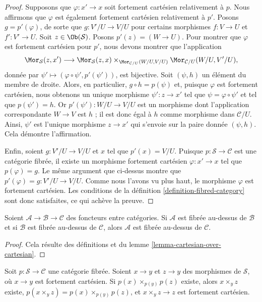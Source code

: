 \begin{proof}
Supposons que $\varphi : x' \to x$ soit fortement cartésien relativement
à $p$. Nous affirmons que $\varphi$ est également fortement cartésien
relativement à $p'$. Posons $g = p'(\varphi)$, de sorte que
$g : V'/U \to V/U$ pour certains morphismes $f : V \to U$ et
$f' : V' \to U$.
Soit $z \in \Ob(\mathcal{S})$. Posons $p'(z) = (W \to U)$.
Pour montrer que $\varphi$ est fortement cartésien pour $p'$, nous devons
montrer que l'application
$$
\Mor_\mathcal{S}(z, x')
\longrightarrow
\Mor_\mathcal{S}(z, x)
\times_{\Mor_{\mathcal{C}/U}(W/U, V/U)}
\Mor_{\mathcal{C}/U}(W/U, V'/U),
$$
donnée par $\psi' \longmapsto (\varphi \circ \psi', p'(\psi'))$,
est bijective. Soit $(\psi, h)$ un élément du membre de droite. Alors, en
particulier, $g \circ h = p(\psi)$ et, puisque $\varphi$ est fortement
cartésien, nous obtenons un unique morphisme $\psi' : z \to x'$ tel que
$\psi = \varphi \circ \psi'$ et tel que $p(\psi') = h$. Or $p'(\psi') : W/U \to V/U$ est un morphisme
dont l'application correspondante $W \to V$ est $h$ ; il est donc égal à $h$ comme morphisme dans $\mathcal{C}/U$.
Ainsi, $\psi'$ est l'unique morphisme $z \to x'$ qui s'envoie sur la paire
donnée $(\psi, h)$. Cela démontre l'affirmation.

\medskip\noindent
Enfin, soient $g : V'/U \to V/U$ et $x$ tel que $p'(x) = V/U$.
Puisque $p : \mathcal{S} \to \mathcal{C}$ est une catégorie fibrée,
il existe un morphisme fortement cartésien $\varphi : x' \to x$
tel que $p(\varphi) = g$.
Le même argument que ci-dessus montre que
$p'(\varphi) = g : V'/U \to V/U$. Comme nous l'avons vu plus haut,
le morphisme $\varphi$ est fortement cartésien. Les conditions de la
définition \ref{definition-fibred-category} sont donc satisfaites, ce qui
achève la preuve.
\end{proof}

\begin{lemma}
\label{lemma-fibred-over-fibred}
Soient $\mathcal{A} \to \mathcal{B} \to \mathcal{C}$ des foncteurs entre
catégories. Si $\mathcal{A}$ est fibrée au-dessus de $\mathcal{B}$ et si
$\mathcal{B}$ est fibrée au-dessus de $\mathcal{C}$, alors $\mathcal{A}$
est fibrée au-dessus de $\mathcal{C}$.
\end{lemma}

\begin{proof}
Cela résulte des définitions et du
lemme \ref{lemma-cartesian-over-cartesian}.
\end{proof}

\begin{lemma}
\label{lemma-fibred-category-representable-goes-up}
Soit $p : \mathcal{S} \to \mathcal{C}$ une catégorie fibrée.
Soient $x \to y$ et $z \to y$ des morphismes de $\mathcal{S}$,
où $x \to y$ est fortement cartésien. Si
$p(x) \times_{p(y)} p(z)$ existe, alors $x \times_y z$ existe,
$p(x \times_y z) = p(x) \times_{p(y)} p(z)$, et
$x \times_y z \to z$ est fortement cartésien.
\end{lemma}

